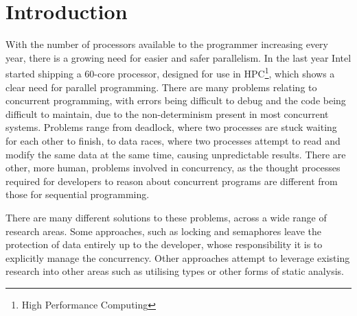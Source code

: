 \documentclass[11pt,a4paper]{report}
\begin{document}
\setcounter{tocdepth}{2}
\tableofcontents

\newpage
\chapter{Introduction}

With the number of processors available to the programmer increasing every year\cite{freelunch}, there is a growing need for easier and safer parallelism.
In the last year Intel started shipping a 60-core processor, designed for use in HPC\footnote{High Performance Computing}\cite{intel-phi}, which shows a clear need for parallel programming.
There are many problems relating to concurrent programming, with errors being difficult to debug and the code being difficult to maintain, due to the non-determinism present in most concurrent systems.
Problems range from deadlock, where two processes are stuck waiting for each other to finish, to data races, where two processes attempt to read and modify the same data at the same time, causing unpredictable results.
There are other, more human, problems involved in concurrency, as the thought processes required for developers to reason about concurrent programs are different from those for sequential programming.

There are many different solutions to these problems, across a wide range of research areas.
Some approaches, such as locking and semaphores\cite{dijkstra-semaphore} leave the protection of data entirely up to the developer, whose responsibility it is to explicitly manage the concurrency.
Other approaches attempt to leverage existing research into other areas such as utilising types or other forms of static analysis.
\end{document}
